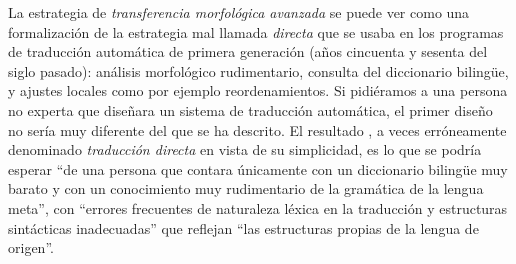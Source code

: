 La estrategia de \emph{transferencia morfológica avanzada} se puede ver como una formalización de la estrategia mal llamada \emph{directa} que se usaba en los programas de traducción automática de primera generación (años cincuenta y sesenta del siglo pasado): análisis morfológico rudimentario, consulta del diccionario bilingüe, y ajustes locales como por ejemplo reordenamientos. Si pidiéramos a una persona no experta que diseñara un sistema de traducción automática, el primer diseño no sería muy diferente del que se ha descrito. El resultado \citep[sección~4.2]{hutchins92b}, a veces erróneamente denominado \emph{traducción directa} en vista de su simplicidad, es lo que se podría esperar ``de una persona que contara únicamente con un diccionario bilingüe muy barato y con un conocimiento muy rudimentario de la gramática de la lengua meta'', con ``errores frecuentes de naturaleza léxica en la traducción y estructuras sintácticas inadecuadas'' que reflejan ``las estructuras propias de la lengua de origen''. 

